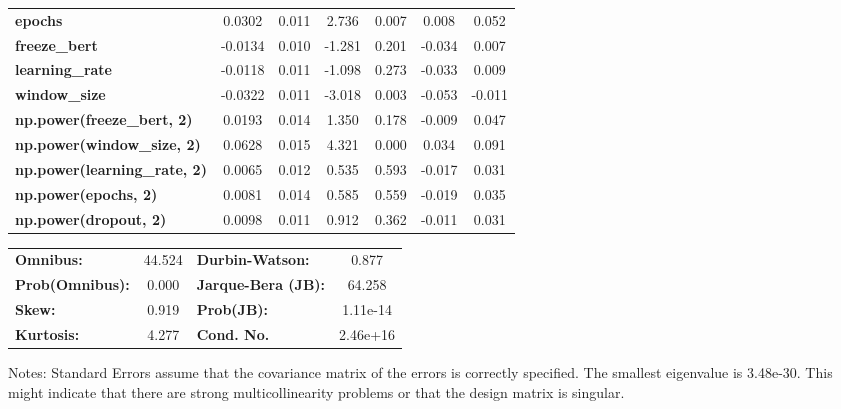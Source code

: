 \begin{center}
\begin{tabular}{lcccccc}
\textbf{epochs}                            &       0.0302  &        0.011     &     2.736  &         0.007        &        0.008    &        0.052     \\
\textbf{freeze\_bert}                      &      -0.0134  &        0.010     &    -1.281  &         0.201        &       -0.034    &        0.007     \\
\textbf{learning\_rate}                    &      -0.0118  &        0.011     &    -1.098  &         0.273        &       -0.033    &        0.009     \\
\textbf{window\_size}                      &      -0.0322  &        0.011     &    -3.018  &         0.003        &       -0.053    &       -0.011     \\
\textbf{np.power(freeze\_bert, 2)}         &       0.0193  &        0.014     &     1.350  &         0.178        &       -0.009    &        0.047     \\
\textbf{np.power(window\_size, 2)}         &       0.0628  &        0.015     &     4.321  &         0.000        &        0.034    &        0.091     \\
\textbf{np.power(learning\_rate, 2)}       &       0.0065  &        0.012     &     0.535  &         0.593        &       -0.017    &        0.031     \\
\textbf{np.power(epochs, 2)}               &       0.0081  &        0.014     &     0.585  &         0.559        &       -0.019    &        0.035     \\
\textbf{np.power(dropout, 2)}              &       0.0098  &        0.011     &     0.912  &         0.362        &       -0.011    &        0.031     \\
\bottomrule
\end{tabular}
\begin{tabular}{lclc}
\textbf{Omnibus:}       & 44.524 & \textbf{  Durbin-Watson:     } &    0.877  \\
\textbf{Prob(Omnibus):} &  0.000 & \textbf{  Jarque-Bera (JB):  } &   64.258  \\
\textbf{Skew:}          &  0.919 & \textbf{  Prob(JB):          } & 1.11e-14  \\
\textbf{Kurtosis:}      &  4.277 & \textbf{  Cond. No.          } & 2.46e+16  \\
\bottomrule
\end{tabular}
\end{center}

Notes: \newline
 [1] Standard Errors assume that the covariance matrix of the errors is correctly specified. \newline
 [2] The smallest eigenvalue is 3.48e-30. This might indicate that there are \newline
 strong multicollinearity problems or that the design matrix is singular.